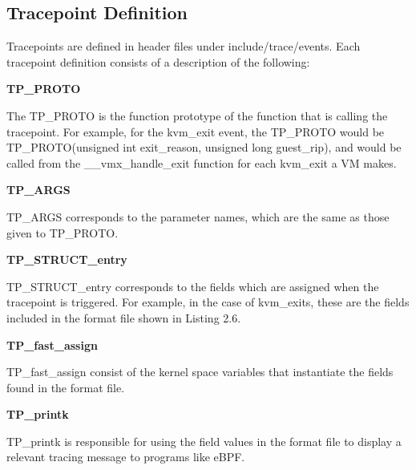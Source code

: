 \documentclass{report}
\begin{document}
\begin{spacing}{1.5}
\subsection{Tracepoint Definition}

{\large
Tracepoints are defined in header files under include/trace/events. Each tracepoint definition consists of a description of the following:
\leavevmode\newline
}

{\large
\textbf{TP\_PROTO}
\leavevmode\newline
}

{\large
\noindent The TP\_PROTO is the function prototype of the function that is calling the tracepoint. For example, for the kvm\_exit event, the TP\_PROTO would be TP\_PROTO(unsigned int exit\_reason, unsigned long guest\_rip), and would be called from the \_\_vmx\_handle\_exit function for each kvm\_exit a VM makes.
\newline
}

{\large
\textbf{TP\_ARGS}
\leavevmode\newline
}

{\large
\noindent TP\_ARGS corresponds to the parameter names, which are the same as those given to TP\_PROTO.
\newline
}

{\large
\textbf{TP\_STRUCT\_entry}
\leavevmode\newline
}

{\large
\noindent TP\_STRUCT\_entry corresponds to the fields which are assigned when the tracepoint is triggered. For example, in the case of kvm\_exits, these are the fields included in the format file shown in Listing 2.6.
\newline
}


{\large
\textbf{TP\_fast\_assign}
\leavevmode\newline
}

{\large
\noindent TP\_fast\_assign consist of the kernel space variables that instantiate the fields found in the format file. 
\newline
}

{\large
\textbf{TP\_printk}
\leavevmode\newline
}

{\large
\noindent TP\_printk is responsible for using the field values in the format file to display a relevant tracing message to programs like eBPF.
\newline
}













\end{spacing}
\end{document}
